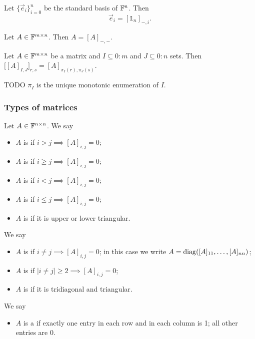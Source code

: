 \begin{lemma} \label{standardBasisFromIdentityMatrix}
Let $\{\vec{e}_i\}_{i=0}^n$ be the standard basis of $\mathbb{F}^n$. Then
\[ \vec{e}_i = [\mathbb{1}_n]_{-, i}. \]
\end{lemma}

\begin{lemma}
Let $A\in \mathbb{F}^{m\times n}$. Then $A = [A]_{-,-}$.
\end{lemma}

\begin{lemma} \label{componentsSubmatrixFromEnumeration}
Let $A\in\mathbb{F}^{m\times n}$ be a matrix and $I\subseteq 0:m$ and $J\subseteq 0:n$ sets.
Then $\big[[A]_{I,J}\big]_{r,s} = [A]_{\pi_I(r), \pi_J(s)}$.
\end{lemma}

TODO $\pi_I$ is the unique monotonic enumeration of $I$.

\subsubsection{Types of matrices}
\begin{definition}
Let $A\in\mathbb{F}^{n\times n}$. We say
\begin{itemize}
\item $A$ is  if $i>j \implies [A]_{i,j} = 0$;
\item $A$ is  if $i\geq j \implies [A]_{i,j} = 0$;
\item $A$ is  if $i<j \implies [A]_{i,j} = 0$;
\item $A$ is  if $i\leq j \implies [A]_{i,j} = 0$;
\item $A$ is  if it is upper or lower triangular.
\end{itemize}
We say
\begin{itemize}
\item $A$ is  if $i\neq j \implies [A]_{i,j} = 0$; in this case we write $A = \operatorname{diag}([A]_{11},\ldots, [A]_{nn})$;
\item $A$ is  if $|i\neq j| \geq 2 \implies [A]_{i,j} = 0$;
\item $A$ is  if it is tridiagonal and triangular.
\end{itemize}
We say
\begin{itemize}
\item $A$ is a  if exactly one entry in each row and in each column is 1; all other entries are 0.
\end{itemize}
\end{definition}

